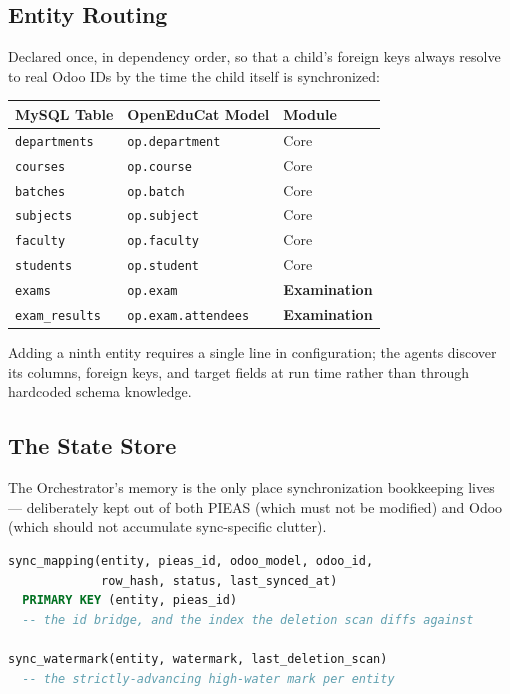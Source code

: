 \documentclass[11pt,a4paper]{article}
\begin{document}
\subsection{Entity Routing}
Declared once, in dependency order, so that a child's foreign keys always resolve to real Odoo IDs by the time the child itself is synchronized:

\begin{table}[h]
\centering
\begin{tabularx}{\textwidth}{@{}l l>{\raggedright\arraybackslash}X@{}}
\toprule
\rowcolor{navy!10}
\textbf{\color{navy}MySQL Table} & \textbf{\color{navy}OpenEduCat Model} & \textbf{\color{navy}Module} \\
\midrule
\texttt{departments} & \texttt{op.department} & Core \\
\texttt{courses} & \texttt{op.course} & Core \\
\texttt{batches} & \texttt{op.batch} & Core \\
\texttt{subjects} & \texttt{op.subject} & Core \\
\texttt{faculty} & \texttt{op.faculty} & Core \\
\texttt{students} & \texttt{op.student} & Core \\
\texttt{exams} & \texttt{op.exam} & \textbf{Examination} \\
\texttt{exam\_results} & \texttt{op.exam.attendees} & \textbf{Examination} \\
\bottomrule
\end{tabularx}
\end{table}

Adding a ninth entity requires a single line in configuration; the agents discover its columns, foreign keys, and target fields at run time rather than through hardcoded schema knowledge.

\subsection{The State Store}
The Orchestrator's memory is the only place synchronization bookkeeping lives --- deliberately kept out of both PIEAS (which must not be modified) and Odoo (which should not accumulate sync-specific clutter).

\begin{lstlisting}[language=SQL, caption={Core schema of the Orchestrator-owned state store}]
sync_mapping(entity, pieas_id, odoo_model, odoo_id,
             row_hash, status, last_synced_at)
  PRIMARY KEY (entity, pieas_id)
  -- the id bridge, and the index the deletion scan diffs against

sync_watermark(entity, watermark, last_deletion_scan)
  -- the strictly-advancing high-water mark per entity
\end{lstlisting}
\end{document}

